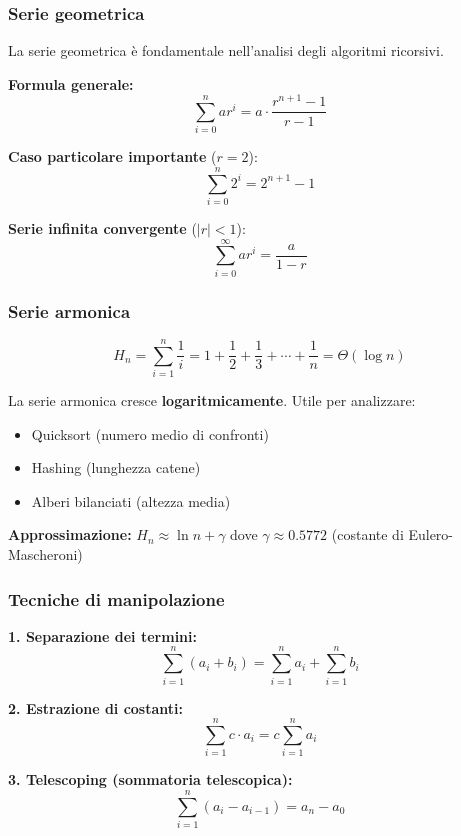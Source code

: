 \documentclass[a4paper, 11pt]{article}
\theoremstyle{definition}
\theoremstyle{remark}
\theoremstyle{remark}
\newenvironment{nota}{%
	\begin{tcolorbox}[
		colback=codebg,
		colframe=primary,
		fonttitle=\bfseries,
		title=Nota,
		left=6pt, right=6pt, top=4pt, bottom=4pt
		]
	}{%
	\end{tcolorbox}
}
\begin{document}
	\subsubsection{Serie geometrica}
	
	\begin{nota}
		La serie geometrica è fondamentale nell'analisi degli algoritmi ricorsivi.
		
		\textbf{Formula generale:}
		\[
		\sum_{i=0}^{n} ar^i = a \cdot \frac{r^{n+1}-1}{r-1}
		\]
		
		\textbf{Caso particolare importante} ($r = 2$):
		\[
		\sum_{i=0}^{n} 2^i = 2^{n+1} - 1
		\]
		
		\textbf{Serie infinita convergente} ($|r| < 1$):
		\[
		\sum_{i=0}^{\infty} ar^i = \frac{a}{1-r}
		\]
	\end{nota}
	
	\subsubsection{Serie armonica}
	
	\[
	H_n = \sum_{i=1}^{n} \frac{1}{i} = 1 + \frac{1}{2} + \frac{1}{3} + \cdots + \frac{1}{n} = \Theta(\log n)
	\]
	
	\begin{nota}
		La serie armonica cresce \textbf{logaritmicamente}. Utile per analizzare:
		\begin{itemize}
			\item Quicksort (numero medio di confronti)
			\item Hashing (lunghezza catene)
			\item Alberi bilanciati (altezza media)
		\end{itemize}
		
		\textbf{Approssimazione:} $H_n \approx \ln n + \gamma$ dove $\gamma \approx 0.5772$ (costante di Eulero-Mascheroni)
	\end{nota}
	
	\subsubsection{Tecniche di manipolazione}
	
	\textbf{1. Separazione dei termini:}
	\[
	\sum_{i=1}^{n} (a_i + b_i) = \sum_{i=1}^{n} a_i + \sum_{i=1}^{n} b_i
	\]
	
	\textbf{2. Estrazione di costanti:}
	\[
	\sum_{i=1}^{n} c \cdot a_i = c \sum_{i=1}^{n} a_i
	\]
	
	\textbf{3. Telescoping (sommatoria telescopica):}
	\[
	\sum_{i=1}^{n} (a_i - a_{i-1}) = a_n - a_0
	\]
	
\end{document}
